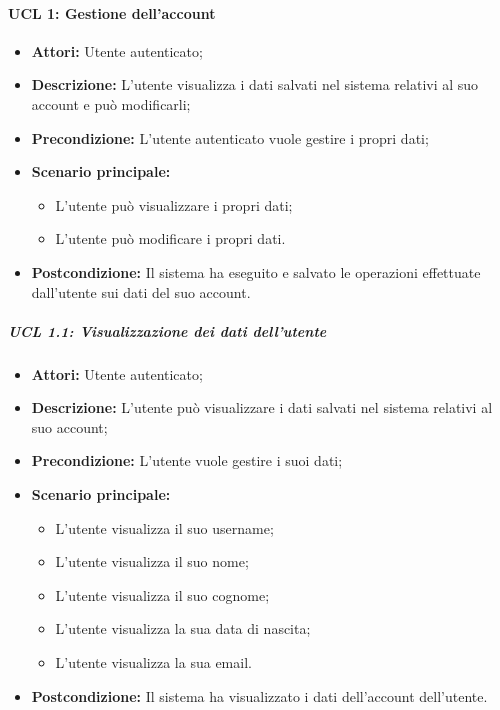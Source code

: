 \paragraph{UCL 1: Gestione dell'account} %
\begin{itemize}
	\item \textbf{Attori:} Utente autenticato;
	\item \textbf{Descrizione:} L'utente visualizza i dati salvati nel sistema relativi al suo account e può modificarli;
	\item \textbf{Precondizione:} L'utente autenticato vuole gestire i propri dati;
	\item \textbf{Scenario principale:}
	\begin{itemize}
		\item L'utente può visualizzare i propri dati;
		\item L'utente può modificare i propri dati.
	\end{itemize}
	\item \textbf{Postcondizione:} Il sistema ha eseguito e salvato le operazioni effettuate dall'utente sui dati del suo account.
\end{itemize}

\subparagraph{UCL 1.1: Visualizzazione dei dati dell'utente}
\begin{itemize}
	\item \textbf{Attori:} Utente autenticato;
	\item \textbf{Descrizione:} L'utente può visualizzare i dati salvati nel sistema relativi al suo account;
	\item \textbf{Precondizione:} L'utente vuole gestire i suoi dati;
	\item \textbf{Scenario principale:}
	\begin{itemize}
		\item L'utente visualizza il suo username;
		\item L'utente visualizza il suo nome;
		\item L'utente visualizza il suo cognome;
		\item L'utente visualizza la sua data di nascita;
		\item L'utente visualizza la sua email.
	\end{itemize}
	\item \textbf{Postcondizione:} Il sistema ha visualizzato i dati dell'account dell'utente.
\end{itemize}

